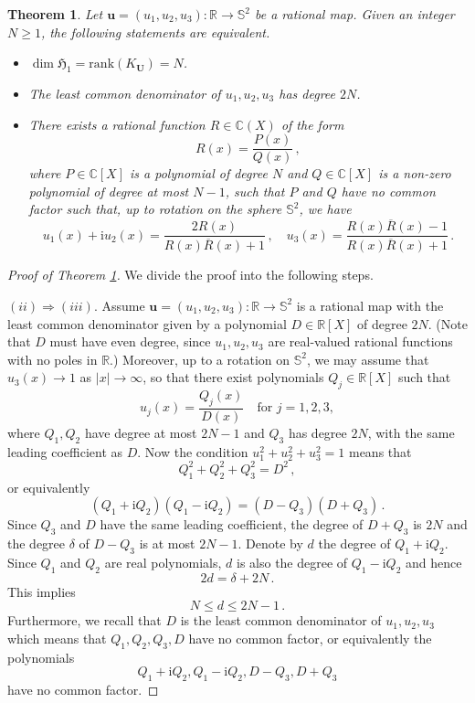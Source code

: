 \documentclass[11pt,reqno]{amsart}
\newtheorem{thm}{Theorem}[section]
\theoremstyle{definition}
\theoremstyle{remark}
\theoremstyle{remark}
\numberwithin{equation}{section}
\newcommand{\Hfr}{\mathfrak{H}}
\newcommand{\C}{\mathbb{C}}
\newcommand{\R}{\mathbb{R}}
\newcommand{\Ss}{\mathbb{S}}
\newcommand{\ov}{\overline}
\newcommand{\rank}{\mathrm{rank}}
\newcommand{\ii}{\mathrm{i}}
\newcommand{\uu}{\mathbf{u}}
\newcommand{\Ub}{\mathbf{U}}
\begin{document}
\begin{appendix}
\begin{thm} \label{thm:toeplitz_stereo_app}
Let $\uu =(u_1, u_2, u_3) : \R \to \Ss^2$ be a rational map. Given an integer $N \geq 1$, the following statements are equivalent.
\begin{itemize}
\item[(i)] $\dim \Hfr_1 = \rank(K_{\Ub}) = N$.
\item[(ii)] The least common denominator of $u_1, u_2, u_3$ has degree $2N$.
\item[(iii)] There exists a rational function $R \in \C(X)$ of the form
$$
R(x) = \frac{P(x)}{Q(x)} \, ,
$$
where $P \in \C[X]$ is a polynomial of degree $N$ and $Q \in \C[X]$ is a non-zero polynomial of degree at most $N-1$, such that $P$ and $Q$ have no common factor such that, up to rotation on the sphere $\Ss^2$, we have
$$
u_1(x) + \ii u_2(x) = \frac{2 R(x)}{R(x) \ov{R}(x)+1} \, , \quad u_3(x) = \frac{R(x) \ov{R}(x) -1}{R(x) \ov{R}(x) + 1} \, .
$$
\end{itemize}
\end{thm}  



\begin{proof}[Proof of Theorem \ref{thm:toeplitz_stereo_app}]
We divide the proof into the following steps.

\medskip
\textbf{$(ii) \Rightarrow (iii)$}. Assume $\uu = (u_1, u_2, u_3) : \R \to \Ss^2$ is a rational map with the least common denominator given by a polynomial $D \in \R[X]$ of degree $2N$. (Note that $D$ must have even degree, since $u_1, u_2, u_3$ are real-valued rational functions with no poles in $\R$.) Moreover, up to a rotation on $\Ss^2$, we may assume that $u_3(x) \to 1$ as $|x| \to \infty$, so that there exist polynomials $Q_j \in \R[X]$ such that
$$
u_j(x) = \frac{Q_j(x)}{D(x)} \quad \mbox{for $j=1,2,3$},
$$
where $Q_1, Q_2$ have degree at most $2N-1$ and $Q_3$ has degree $2N$, with the same leading coefficient as $D$. Now the condition $u_1^2 + u_2^2 + u_3^2 = 1$ means that
$$
Q_1^2 + Q_2^2 + Q_3^2 = D^2 \, , 
$$
or equivalently
$$
(Q_1 + \ii Q_2)(Q_1 - \ii Q_2) = (D-Q_3)(D+Q_3) \, .
$$
Since $Q_3$ and $D$ have the same leading coefficient, the degree of $D+Q_3$ is $2N$ and the degree $\delta$ of $D-Q_3$ is at most $2N-1$. Denote by $d$ the degree of $Q_1 + \ii Q_2$. Since $Q_1$ and $Q_2$ are real polynomials, $d$ is also the degree of $Q_1 - \ii Q_2$ and hence
$$
2d = \delta + 2N \, .
$$
This implies
$$
N \leq d \leq 2N-1 \, .
$$
Furthermore, we recall that $D$ is the least common denominator of $u_1, u_2, u_3$ which means that $Q_1, Q_2, Q_3, D$ have no common factor, or equivalently the polynomials
$$
Q_1+ \ii Q_2, Q_1 - \ii Q_2, D-Q_3, D + Q_3
$$
have no common factor.


\end{proof}
\end{appendix}
\end{document}
